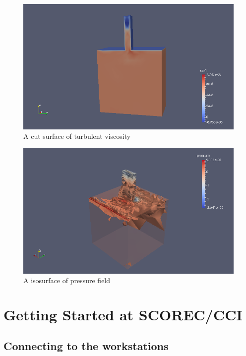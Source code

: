 \documentclass{article}
\begin{document}
\begin{figure}[h!]
\centering
\includegraphics[width=1\textwidth]{res1}
\caption{A cut surface of turbulent viscosity}
\label{fig:5}
\end{figure}

\begin{figure}[h!]
\centering
\includegraphics[width=1\textwidth]{res2}
\caption{A isosurface of pressure field}
\label{fig:6}
\end{figure}

\pagebreak


\appendix


\section{Getting Started at SCOREC/CCI}
\label{ch:1}
\subsection{Connecting to the workstations}
\label{ch:1.1}
\end{document}
